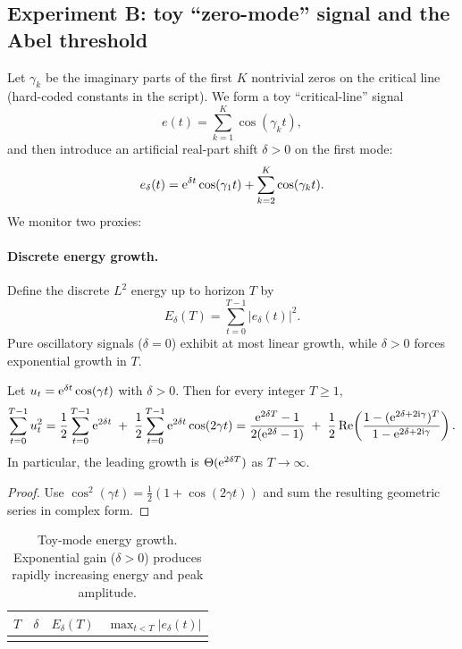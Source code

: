 \subsection{Experiment B: toy ``zero-mode'' signal and the Abel threshold}
\label{sec:expB_toy_modes}

Let $\gamma_k$ be the imaginary parts of the first $K$ nontrivial zeros on the critical line (hard-coded constants in the script).
We form a toy ``critical-line'' signal
\[
e(t)=\sum_{k=1}^K \cos(\gamma_k t),
\]
and then introduce an artificial real-part shift $\delta>0$ on the first mode:
\[
e_\delta(t)=\mathrm{e}^{\delta t}\cos(\gamma_1 t)+\sum_{k=2}^K \cos(\gamma_k t).
\]
We monitor two proxies:

\paragraph{Discrete energy growth.}
Define the discrete $L^2$ energy up to horizon $T$ by
\[
E_\delta(T)=\sum_{t=0}^{T-1} |e_\delta(t)|^2.
\]
Pure oscillatory signals ($\delta=0$) exhibit at most linear growth, while $\delta>0$ forces exponential growth in $T$.

\begin{lemma}
\label{lem:toy_energy_closed_form}
Let $u_t=\mathrm{e}^{\delta t}\cos(\gamma t)$ with $\delta>0$.
Then for every integer $T\ge 1$,
\[
\sum_{t=0}^{T-1} u_t^2
=\frac{1}{2}\sum_{t=0}^{T-1}\mathrm{e}^{2\delta t}
\;+\;\frac{1}{2}\sum_{t=0}^{T-1}\mathrm{e}^{2\delta t}\cos(2\gamma t)
=\frac{\mathrm{e}^{2\delta T}-1}{2(\mathrm{e}^{2\delta}-1)}
\;+\;\frac{1}{2}\operatorname{Re}\!\left(\frac{1-(\mathrm{e}^{2\delta+2\mathrm{i}\gamma})^{T}}{1-\mathrm{e}^{2\delta+2\mathrm{i}\gamma}}\right).
\]
In particular, the leading growth is $\Theta(\mathrm{e}^{2\delta T})$ as $T\to\infty$.
\end{lemma}

\begin{proof}
Use $\cos^2(\gamma t)=\tfrac12(1+\cos(2\gamma t))$ and sum the resulting geometric series in complex form.
\end{proof}

\begin{table}[t]
\centering
\begin{tabular}{@{}rccc@{}}
\toprule
$T$ & $\delta$ & $E_\delta(T)$ & $\max_{t<T}|e_\delta(t)|$ \\
\midrule

\\
\bottomrule
\end{tabular}
\caption{Toy-mode energy growth. Exponential gain ($\delta>0$) produces rapidly increasing energy and peak amplitude.}
\label{tab:toy_energy}
\end{table}

